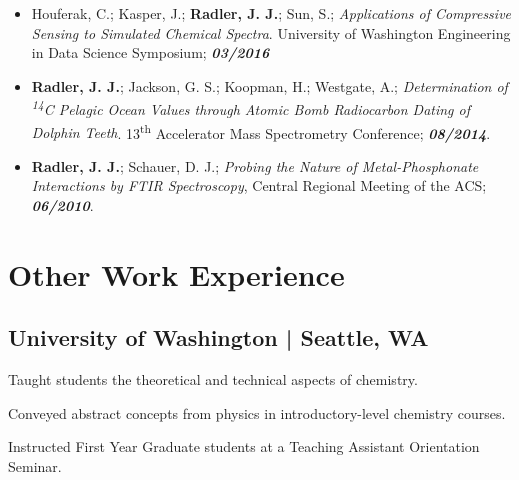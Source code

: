 \documentclass[letterpaper]{deedy-resume} %
\begin{document}
\begin{minipage}[t]{0.65\textwidth}
\begin{itemize}
\item Houferak, C.; Kasper, J.; \textbf{Radler, J. J.}; Sun, S.; \emph{Applications of Compressive Sensing to Simulated Chemical Spectra}. University of Washington Engineering in Data Science Symposium;	\textbf{\textit{03/2016}}

\item \textbf{Radler, J. J.}; Jackson, G. S.; Koopman, H.; Westgate, A.; \emph{Determination of \textsuperscript{14}C Pelagic Ocean Values through Atomic Bomb Radiocarbon Dating of Dolphin Teeth}. 13\textsuperscript{th} Accelerator Mass Spectrometry Conference;	\textbf{\textit{08/2014}}.

\item \textbf{Radler, J. J.}; Schauer, D. J.; \emph{Probing the Nature of Metal-Phosphonate Interactions by FTIR Spectroscopy}, Central Regional Meeting of the ACS;	\textbf{\textit{06/2010}}.
\end{itemize}

\section{Other Work Experience}
\subsection{University of Washington | Seattle, WA}
\vspace{\topsep} %
\begin{tightitemize}
\item Taught students the theoretical and technical aspects of chemistry.
\item Conveyed abstract concepts from physics in introductory-level chemistry courses.
\item Instructed First Year Graduate students at a Teaching Assistant Orientation Seminar.
\end{tightitemize}


\end{minipage}
\end{document}
